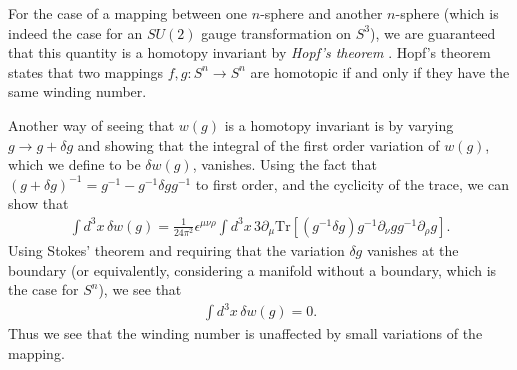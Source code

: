     For the case of a mapping between one $n$-sphere and another $n$-sphere (which is indeed the case  for an $SU(2)$ gauge transformation on $S^3$), we are guaranteed that this quantity is a homotopy invariant by \textit{Hopf's theorem} \cite{Dugundji}. Hopf's theorem states that two mappings $f,g: S^n \rightarrow S^n$ are homotopic if and only if they have the same winding number.

    Another way of seeing that $w(g)$ is a homotopy invariant is by varying $g\rightarrow g+\delta g$ and showing that the integral of the first order variation of $w(g)$, which we define to be $\delta w(g)$, vanishes. Using the fact that $(g+\delta g)^{-1} = g^{-1} - g^{-1} \delta g g^{-1}$ to first order, and the cyclicity of the trace, we can show that
\begin{align}
       \int d^3x \, \delta w(g) = \frac{1}{24 \pi^2} \epsilon^{\mu \nu \rho} \int d^3 x \, 3 \partial_{\mu}\mathrm{Tr} \left[(g^{-1} \delta g) g^{-1} \partial_{\nu} g g^{-1} \partial_{\rho} g \right].
\end{align}
Using Stokes' theorem and requiring that the variation $\delta g$ vanishes at the boundary (or equivalently, considering a manifold without a boundary, which is the case for $S^n$), we see that
\begin{align}
     \int d^3 x \, \delta w(g) =0.
\end{align}
Thus we see that the winding number is unaffected by small variations of the mapping.

